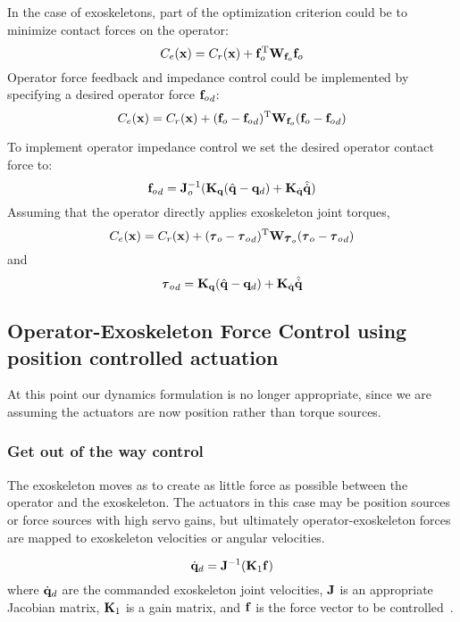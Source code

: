 \documentclass[letterpaper,12pt,fullpage]{article}
\begin{document}
In the case of exoskeletons, part of the optimization criterion could be to
minimize contact forces on the operator:
\begin{equation}
C_e({\bf x}) = C_r({\bf x}) + {\bf f}^{{\rm T}}_o {\bf W}_{{\bf f}_o} {\bf f}_o
\end{equation}
Operator force feedback and impedance control could be implemented by specifying a
desired operator force ${{\bf f}_o}_d$:
\begin{equation}
C_e({\bf x}) = C_r({\bf x}) + ({\bf f}_o - {{\bf f}_o}_d)^{{\rm T}} {\bf W}_{{\bf f}_o} ({\bf f}_o - {{\bf f}_o}_d)
\end{equation}

To implement operator impedance control we set the desired operator contact force to:
\begin{equation}
{{\bf f}_o}_d = {\bf J}_o^{-1} ( {\bf K}_{{\bf q}}( \hat{{\bf q}} - {\bf q}_d ) + {\bf K}_{\dot{{\bf q}}} \hat{\dot{{\bf q}}} )
\end{equation}
Assuming that the operator directly applies exoskeleton joint torques,
\begin{equation}
C_e(\vx) = C_r(\vx) 
+ (\vtau_o - {\vtau_o}_d)^{\tr} \mW_{\vtau_o} (\vtau_o - {\vtau_o}_d)
\end{equation}
and
\begin{equation}
{\vtau_o}_d = \mK_{\vq}( \hat{\vq} - \vq_d ) + \mK_{\dot{\vq}} \hat{\dot{\vq}}
\end{equation}

\subsection{Operator-Exoskeleton Force Control using position controlled actuation}

At this point our dynamics formulation is no longer appropriate, since we
are assuming the actuators are now position rather than torque sources.

\subsubsection{Get out of the way control}

The exoskeleton moves as to create as little force as possible between the
operator and the exoskeleton. The actuators in this case may be position sources or
force sources with high servo gains,
but ultimately operator-exoskeleton forces are mapped
to exoskeleton velocities or angular velocities.

\begin{equation}
\dot{{\bf q}}_d = {\bf J}^{-1} ({\bf K}_1 {\bf f})
\label{eq:gootwcps}
\end{equation}
where $\dot{{\bf q}}_d$ are the commanded exoskeleton joint velocities,
${\bf J}$ is an appropriate Jacobian matrix, ${\bf K}_1$ is a gain matrix,
and ${\bf f}$ is the force vector to be controlled~\cite{IEEE06990981}.
\end{document}
